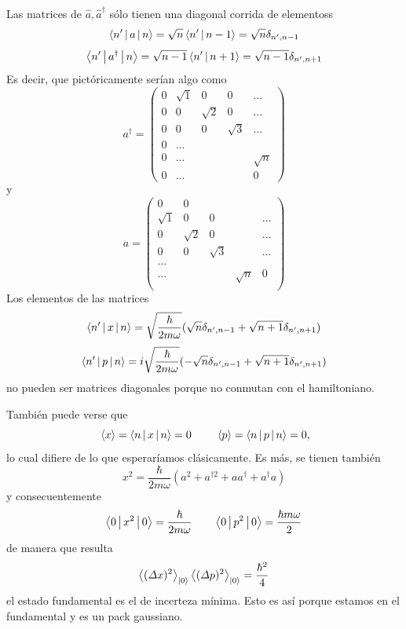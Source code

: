 \documentclass[10pt,oneside]{CBFT_book}
\begin{document}
Las matrices de $\hat{a},\hat{a}^\dagger$ sólo tienen una diagonal corrida de elementoss 
\[
	\Braket{n'|a|n} = \sqrt{n} \Braket{n'|n-1} = \sqrt{n} \delta_{n',n-1}
\]
\[
	\Braket{n'|a^\dagger|n} =  \sqrt{n-1} \Braket{n'|n+1} = \sqrt{n-1} \delta_{n',n+1}
\]
Es decir, que pictóricamente serían algo como
\[
	a^\dagger = \begin{pmatrix}
	0 & \sqrt{1} & 0 & 0 & ... \\
	0 & 	0    & \sqrt{2} & 0 & ... \\
	0 & 	0    & 0 & \sqrt{3} & ... \\
	0 & ... \\
	0 & ... & & & \sqrt{n} \\
	0 & ... & & & 0 
	\end{pmatrix}
\]
y
\[
	a = \begin{pmatrix}
	0 & 0 & & & \\
	\sqrt{1} & 0 & 0 & & ... \\
		0    & \sqrt{2} & 0 & & ... \\
	 	0    & 0 & \sqrt{3} & &... \\
	 ... \\
	 ... & & & \sqrt{n} & 0 \\
	\end{pmatrix}
\]
Los elementos de las matrices
\[
	\Braket{n'|x|n} = \sqrt{\frac{\hbar}{2m\omega}}
	(\sqrt{n}\delta_{n',n-1} + \sqrt{n+1}\delta_{n',n+1})
\]
\[
	\Braket{n'|p|n} = i \sqrt{\frac{\hbar}{2m\omega}}
	(-\sqrt{n}\delta_{n',n-1} + \sqrt{n+1}\delta_{n',n+1})
\]
no pueden ser matrices diagonales porque no conmutan con el hamiltoniano.

También puede verse que 
\[
	\:\left\langle x \right\rangle = \Braket{n|x|n}= 0 \qquad \:\left\langle p \right\rangle = \Braket{n|p|n}= 0,
\]
lo cual difiere de lo que esperaríamos clásicamente. Es más, se tienen también
\[
	x^2 = \frac{\hbar}{2 m \omega}( a^2 + a^{\dagger 2} + aa^\dagger + a^\dagger a )
\]
y consecuentemente
\[
	\Braket{0|x^2|0}= \frac{\hbar}{2 m \omega} \qquad 
	\Braket{0|p^2|0}= \frac{\hbar m \omega}{2}
\]
de manera que resulta
\[
	\Braket{(\Delta x)^2}_{\Ket{0}} \Braket{(\Delta p)^2}_{\Ket{0}} = \frac{\hbar^2}{4} 
\]
el estado fundamental es el de incerteza mínima.
Esto es así porque estamos en el fundamental y es un pack gaussiano.
\end{document}
